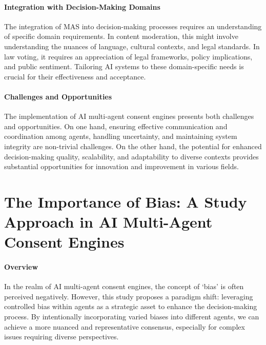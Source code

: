 \documentclass{article}
\begin{document}
\hypertarget{integration-with-decision-making-domains}{%
\paragraph{Integration with Decision-Making
Domains}\label{integration-with-decision-making-domains}}

The integration of MAS into decision-making processes requires an
understanding of specific domain requirements. In content moderation,
this might involve understanding the nuances of language, cultural
contexts, and legal standards. In law voting, it requires an
appreciation of legal frameworks, policy implications, and public
sentiment. Tailoring AI systems to these domain-specific needs is
crucial for their effectiveness and acceptance.

\hypertarget{challenges-and-opportunities}{%
\paragraph{Challenges and
Opportunities}\label{challenges-and-opportunities}}

The implementation of AI multi-agent consent engines presents both
challenges and opportunities. On one hand, ensuring effective
communication and coordination among agents, handling uncertainty, and
maintaining system integrity are non-trivial challenges. On the other
hand, the potential for enhanced decision-making quality, scalability,
and adaptability to diverse contexts provides substantial opportunities
for innovation and improvement in various fields.

\hypertarget{the-importance-of-bias-a-study-approach-in-ai-multi-agent-consent-engines}{%
\section*{The Importance of Bias: A Study Approach in AI
Multi-Agent Consent
Engines}\label{the-importance-of-bias-a-study-approach-in-ai-multi-agent-consent-engines}}

\hypertarget{overview}{%
\paragraph{Overview}\label{overview}}

In the realm of AI multi-agent consent engines, the concept of `bias' is
often perceived negatively. However, this study proposes a paradigm
shift: leveraging controlled bias within agents as a strategic asset to
enhance the decision-making process. By intentionally incorporating
varied biases into different agents, we can achieve a more nuanced and
representative consensus, especially for complex issues requiring
diverse perspectives.
\end{document}
